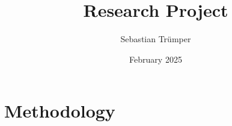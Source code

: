 \documentclass[british,         %
BCOR=2mm,                       %
11pt,                           %
a4paper,						%
oneside,						%
cdgeometry=centered,            %
toc=chapterentrydotfill,        %
toc=indent,                     %
bibliography=totoc,         	%
listof=totoc,                   %
numbers=noenddot,				%
parskip=full,                   %
cdfont=true
]{tudscrreprt}                  %
\title{Research Project}
\author{Sebastian Trümper}
\date{February 2025}
\begin{document}
\doublespacing



\begin{abstract}
	
\end{abstract}


\tableofcontents





\setcounter{page}{1}





\chapter{Methodology}



















\end{document}
